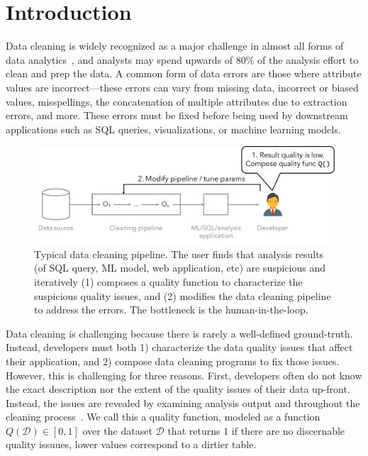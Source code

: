 \section{Introduction}\label{intro}\sloppy


Data cleaning is widely recognized as a major challenge in almost all forms of data analytics~\cite{nytimes}, and analysts may spend upwards of 80\% of the analysis effort to clean and prep the data.  A common form of data errors are those where attribute values are incorrect---these errors can vary from missing data, incorrect or biased values, misspellings, the concatenation of multiple attributes due to extraction errors, and more.  These errors must be fixed before being used by downstream applications such as SQL queries, visualizations, or machine learning models.    

\begin{figure}[t]
  \centering
 \includegraphics[width=\columnwidth]{figures/user-pipeline}
 \caption{\small Typical data cleaning pipeline.  The user finds that analysis results (of SQL query, ML model, web application, etc) are suspicious and iteratively (1) composes a quality function to characterize the suspicious quality issues, and (2) modifies the data cleaning pipeline to address the errors.  The bottleneck is the human-in-the-loop.  \label{fig:teaser}}
\end{figure}



Data cleaning is challenging because there is rarely a well-defined ground-truth. Instead, developers must both 1) characterize the data quality issues that affect their application, and 2) compose data cleaning programs to fix those issues.  However, this is challenging for three reasons.  First, developers often do not know the exact description nor the extent of the quality issues of their data up-front.  Instead, the issues are revealed by examining analysis output and throughout the cleaning process~\cite{krishnan2016hilda}.    We call this a quality function, modeled as a function $Q(\mathcal{D}) \in [0, 1]$ over the dataset $\mathcal{D}$ that returns $1$ if there are no discernable quality issuues, lower values correspond to a dirtier table.

